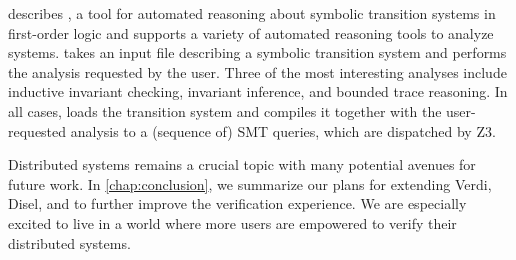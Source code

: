 describes \mypyvy, a tool for automated reasoning about
symbolic transition systems in first-order logic and supports a
variety of automated reasoning tools to analyze systems.
\mypyvy takes an input file describing a symbolic transition system
and performs the analysis requested by the user. Three of the most
interesting analyses include inductive invariant checking,
invariant inference, and bounded trace reasoning.
In all cases, \mypyvy loads the transition system and compiles
it together with the user-requested analysis to a (sequence of) SMT queries,
which are dispatched by Z3.

Distributed systems remains a crucial topic with many potential avenues
for future work. In \cref{chap:conclusion}, we summarize our plans for extending
Verdi, Disel, and \mypyvy to further improve the verification experience.
We are especially excited to live in a world where more users are
empowered to verify their distributed systems.